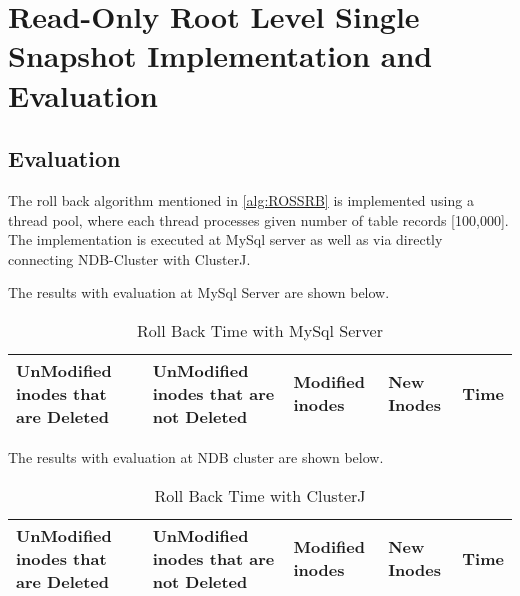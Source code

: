
%
%
%


\chapter{Read-Only Root Level Single Snapshot Implementation and Evaluation}
\label{ch:RONSIE}




\section{Evaluation}

The roll back algorithm mentioned in \ref{alg:ROSSRB} is implemented using a thread pool, where each thread processes given number of table records [100,000]. The implementation is executed at MySql server as well as via directly connecting NDB-Cluster\cite{29} with ClusterJ\cite{clusterj}. 

The results with evaluation at MySql Server are shown below.
\begin{table}[t]
\centering
\begin{tabular}{|p{4cm}|p{4cm}|l|l|l|}
\hline
UnModified inodes 
that are Deleted&
UnModified inodes 
that are not Deleted&
Modified inodes&
New Inodes&
Time\\
\hline

\end{tabular}
\caption{Roll Back Time with MySql Server}
\label{rollBack_MySqlServer}
\end{table}

The results with evaluation at NDB cluster are shown below.
\begin{table}[t]
\centering
\begin{tabular}{|p{4cm}|p{4cm}|l|l|l|}
\hline
UnModified inodes 
that are Deleted&
UnModified inodes 
that are not Deleted&
Modified inodes&
New Inodes&
Time\\
\hline

\end{tabular}
\caption{Roll Back Time with ClusterJ}
\label{rollBack_clusterj}
\end{table}




